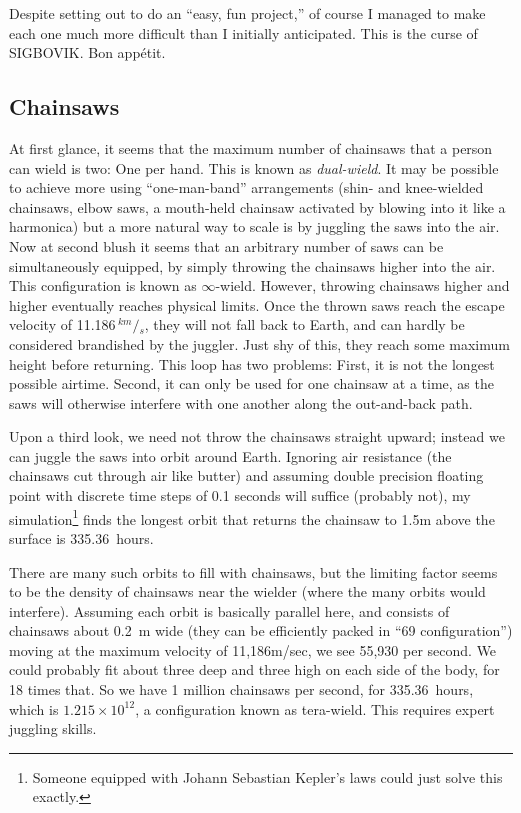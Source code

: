 \documentclass[twocolumn]{article}
\newcommand\sfrac[2]{\!{}\,^{#1}\!/{}\!_{#2}}
\begin{document}
Despite setting out to do an ``easy, fun project,'' of course I
managed to make each one much more difficult than I initially
anticipated. This is the curse of SIGBOVIK. Bon app\'etit.

\subsection{Chainsaws}

At first glance, it seems that the maximum number of chainsaws that a
person can wield is two: One per hand. This is known as {\em
  dual-wield}. It may be possible to achieve more using
``one-man-band'' arrangements (shin- and knee-wielded chainsaws, elbow
saws, a mouth-held chainsaw activated by blowing into it like a
harmonica) but a more natural way to scale is by juggling the saws
into the air. Now at second blush it seems that an arbitrary number of
saws can be simultaneously equipped, by simply throwing the chainsaws
higher into the air. This configuration is known as $\infty$-wield.
However, throwing chainsaws higher and higher eventually reaches
physical limits. Once the thrown saws reach the escape velocity of
11.186$\sfrac{km}{s}$, they will not fall back to Earth, and can
hardly be considered brandished by the juggler. Just shy of this, they
reach some maximum height before returning. This loop has two
problems: First, it is not the longest possible airtime. Second, it
can only be used for one chainsaw at a time, as the saws will
otherwise interfere with one another along the out-and-back path.

Upon a third look, we need not throw the chainsaws straight upward;
instead we can juggle the saws into orbit around Earth. Ignoring air
resistance (the chainsaws cut through air like butter) and assuming
double precision floating point with discrete time steps of 0.1
seconds will suffice (probably not), my simulation\footnote{ Someone
  equipped with Johann Sebastian Kepler's laws could just solve this
  exactly.} finds the longest orbit that returns the chainsaw to 1.5m
above the surface is 335.36~hours.

There are many such orbits to fill with chainsaws, but the limiting
factor seems to be the density of chainsaws near the wielder (where
the many orbits would interfere). Assuming each orbit is basically
parallel here, and consists of chainsaws about 0.2~m wide (they can be
efficiently packed in ``69 configuration'') moving at the maximum
velocity of 11,186m/sec, we see 55,930 per second. We could probably
fit about three deep and three high on each side of the body, for 18
times that. So we have 1 million chainsaws per second, for
335.36~hours, which is $1.215 \times 10^{12}$, a configuration known
as tera-wield. This requires expert juggling skills.
\end{document}
